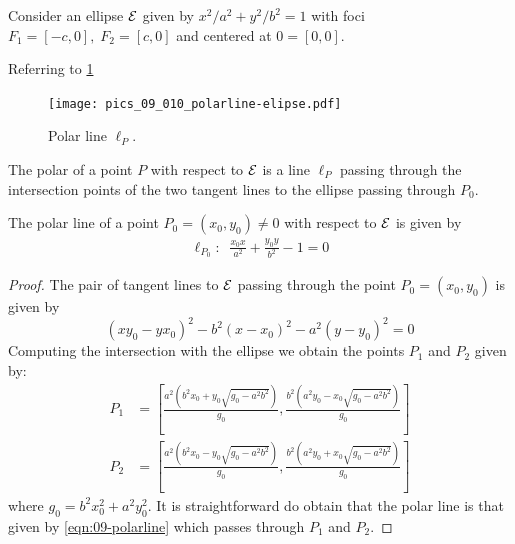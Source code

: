  
 
 
  Consider an ellipse $\mathcal{E}$ given by $x^2/a^2+y^2/b^2=1$ with foci $F_1=[-c,0],\; F_2=[c,0]$ and centered at $0=[0,0].$
  
  Referring to \cref{fig:pics-09- polar-ellipse}
  
  \begin{figure}
      \centering
      \texttt{[image: pics\_09\_010\_polarline-elipse.pdf]}
      \caption{Polar line $\ell_P$.}
      \label{fig:pics-09- polar-ellipse}
  \end{figure}
 \begin{definition}
The polar of a point $P$ with respect to $\mathcal{E}$ is a line $\ell_{P}$ passing through the intersection points  of the two tangent lines to the ellipse passing through $P_0$.
 \label{def:09-polarline}
 \end{definition}
 
 \begin{lemma}
 The polar line   of a point $P_0=(x_0,y_0)\ne 0$ with respect to  $\mathcal{E}$  is given by
 \begin{align}
\ell_{P_0}: \;\; \frac{x_0x}{a^2}+\frac{y_0y}{b^2}-1=0 \label{eqn:09-polarline}
\end{align}
  \label{lem:09-polarline}
  \end{lemma}
  
  \begin{proof}
  The pair of tangent lines to $\mathcal{E}$ passing through the point $P_0=(x_0,y_0)$ is given by
 \[ \left( x{ y_0}-y{x_0} \right) ^{2}-{b}^{2} \left( x-{  x_0}
 \right) ^{2}-{a}^{2} \left( y-{ y_0} \right) ^{2}=0 \]
 Computing the intersection with the ellipse we obtain the points $P_1$ and $P_2$ given by:
 \begin{align*}
     P_1 &= \left[\frac{ a^2\left(b^2 x_0 +   y_0\sqrt{g_0-a^2b^2}\right)}{g_0},   \frac{b^2\left(a^2y_0 -  x_0\sqrt{g_0-a^2b^2}\right)}{g_0} \right] \\
      P_2 &= \left[\frac{ a^2\left(b^2 x_0 -   y_0\sqrt{g_0-a^2b^2}\right)}{g_0},   \frac{b^2\left(a^2y_0+  x_0\sqrt{g_0-a^2b^2}\right)}{g_0} \right] 
 \end{align*}
 where $g_0=b^2x_0^2+a^2y_0^2.$
 It is straightforward do obtain that the polar line is that given by  \cref{eqn:09-polarline} which passes through  $P_1$ and $P_2$.
  \end{proof}
  
